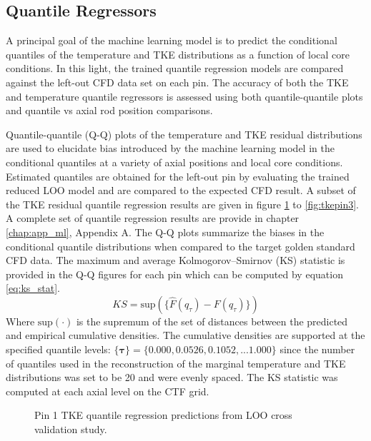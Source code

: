 \subsection{Quantile Regressors}

A principal goal of the machine learning model is to predict the conditional quantiles of the temperature and TKE distributions as a function of local core conditions.  In this light, the trained quantile regression models are compared against the left-out CFD data set on each pin.  The accuracy of both the TKE and temperature quantile regressors is assessed using both quantile-quantile plots and quantile vs axial rod position comparisons.

Quantile-quantile (Q-Q) plots of the temperature and TKE residual distributions are used to elucidate bias introduced by the machine learning model in the conditional quantiles at a variety of axial positions and local core conditions.  Estimated quantiles are obtained for the left-out pin by evaluating the trained reduced LOO model and are compared to the expected CFD result.
A subset of the TKE residual quantile regression results are given in figure \ref{fig:tkepin1} to \ref{fig:tkepin3}.  A complete set of quantile regression results are provide in chapter \ref{chap:app_ml}, Appendix A. The Q-Q plots summarize the biases in the conditional quantile distributions when compared to the target golden standard CFD data.  The maximum and average Kolmogorov–Smirnov (KS) statistic is provided in the Q-Q figures for each pin which can be computed by equation \ref{eq:ks_stat}.
\begin{equation}
    KS = \mathrm{sup}(\{\hat F(q_{\tau}) - F(q_{\tau})\})
\label{eq:ks_stat}
\end{equation}
Where $\mathrm{sup}(\cdot)$ is the supremum of the set of distances between the predicted and empirical cumulative densities.  The cumulative densities are supported at the specified quantile levels: $\{\mathbf \tau\} = \{0.000, 0.0526, 0.1052, ... 1.000 \}$ since the number of quantiles used in the reconstruction of the marginal temperature and TKE distributions was set to be 20 and were evenly spaced.
The KS statistic was computed at each axial level on the CTF grid.

\begin{figure}[H]%
    \centering
    \qquad
    \caption[Q-Q LOO TKE pin 1 results.]{Pin 1 TKE quantile regression predictions from LOO cross validation study.}%
    \label{fig:tkepin1}%
\end{figure}

